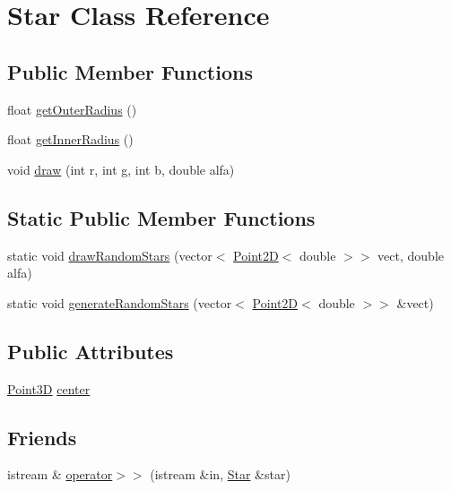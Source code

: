 \hypertarget{classStar}{\section{Star Class Reference}
\label{classStar}
}
\subsection*{Public Member Functions}
\begin{DoxyCompactItemize}
\item 
float \hyperlink{classStar_a3270c6370a58a3cd1b3f208772928fd4}{get\-Outer\-Radius} ()
\item 
float \hyperlink{classStar_a7589c551056483d088f0c8e2ae56f182}{get\-Inner\-Radius} ()
\item 
void \hyperlink{classStar_a5b5a633e1411e3ba772a583d13455a77}{draw} (int r, int g, int b, double alfa)
\end{DoxyCompactItemize}
\subsection*{Static Public Member Functions}
\begin{DoxyCompactItemize}
\item 
static void \hyperlink{classStar_a5e8cf08bf8519faf9c6fe29db77c5b95}{draw\-Random\-Stars} (vector$<$ \hyperlink{classPoint2D}{Point2\-D}$<$ double $>$$>$ vect, double alfa)
\item 
static void \hyperlink{classStar_a5a45a1a26f35e13f54ca52baf64f6970}{generate\-Random\-Stars} (vector$<$ \hyperlink{classPoint2D}{Point2\-D}$<$ double $>$$>$ \&vect)
\end{DoxyCompactItemize}
\subsection*{Public Attributes}
\begin{DoxyCompactItemize}
\item 
\hyperlink{classPoint3D}{Point3\-D} \hyperlink{classStar_a56595bbf2da9c7b2de04be76f61d2e93}{center}
\end{DoxyCompactItemize}
\subsection*{Friends}
\begin{DoxyCompactItemize}
\item 
istream \& \hyperlink{classStar_ad3471c4d5d15b774543031939eda0f5d}{operator$>$$>$} (istream \&in, \hyperlink{classStar}{Star} \&star)
\end{DoxyCompactItemize}


